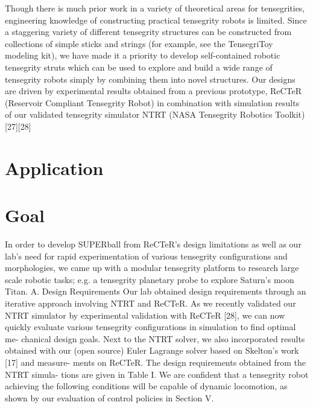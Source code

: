 Though there is much prior work in a variety of theoretical
areas for tensegrities, engineering knowledge of constructing
practical  tensegrity  robots  is  limited.  Since  a  staggering
variety  of  different  tensegrity  structures  can  be  constructed
from  collections  of  simple  sticks  and  strings  (for  example,
see the TensegriToy modeling kit), we have made it a priority
to develop self-contained robotic tensegrity struts which can
be  used  to  explore  and  build  a  wide  range  of  tensegrity
robots  simply  by  combining  them  into  novel  structures.
Our  designs  are  driven  by  experimental  results  obtained
from  a  previous  prototype,  ReCTeR  (Reservoir  Compliant
Tensegrity Robot) in combination with simulation results of
our validated tensegrity simulator NTRT (NASA Tensegrity
Robotics Toolkit) [27][28]

\section{Application}


\section{Goal}

In  order  to  develop  SUPERball  from  ReCTeR’s  design
limitations as well as our lab’s need for rapid experimentation
of  various  tensegrity  configurations  and  morphologies,  we
came  up  with  a  modular  tensegrity  platform  to  research
large  scale  robotic  tasks;  e.g.  a  tensegrity  planetary  probe
to explore Saturn’s moon Titan.
A.  Design Requirements
Our lab obtained design requirements through an iterative
approach  involving  NTRT  and  ReCTeR.  As  we  recently
validated  our  NTRT  simulator  by  experimental  validation
with  ReCTeR  [28],  we  can  now  quickly  evaluate  various
tensegrity  configurations  in  simulation  to  find  optimal  me-
chanical  design  goals.  Next  to  the  NTRT  solver,  we  also
incorporated  results  obtained  with  our  (open  source)  Euler
Lagrange solver based on Skelton’s work [17] and measure-
ments on ReCTeR.
The design requirements obtained from the NTRT simula-
tions are given in Table I. We are confident that a tensegrity
robot achieving the following conditions will be capable of
dynamic locomotion, as shown by our evaluation of control
policies in Section V.

